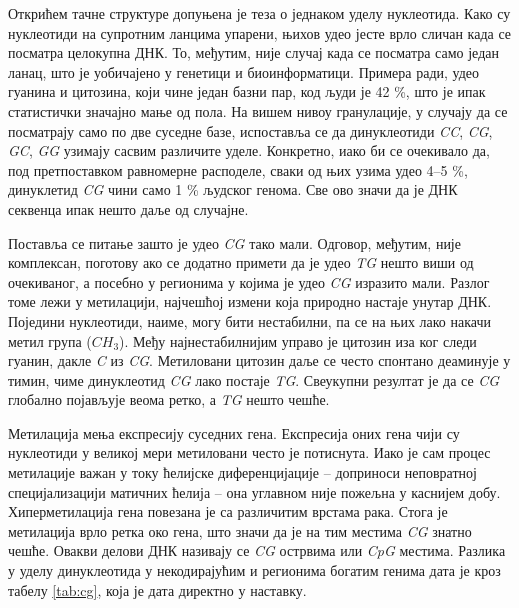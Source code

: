 \documentclass[12pt,oneside]{memoir}
\begin{document}
\begin{CJK}{UTF8}{ipxm}
Открићем тачне структуре допуњена је теза о једнаком уделу нуклеотида. Како су нуклеотиди на супротним ланцима упарени, њихов удео јесте врло сличан када се посматра целокупна ДНК. То, међутим, није случај када се посматра само један ланац, што је уобичајено у генетици и биоинформатици. Примера ради, удео гуанина и цитозина, који чине један базни пар, код људи је 42 \%, што је ипак статистички значајно мање од пола. На вишем нивоу гранулације, у случају да се посматрају само по две суседне базе, испоставља се да динуклеотиди \textit{CC}, \textit{CG}, \textit{GC}, \textit{GG} узимају сасвим различите уделе. Конкретно, иако би се очекивало да, под претпоставком равномерне расподеле, сваки од њих узима удео 4--5 \%, динуклетид \textit{CG} чини само 1 \% људског генома. Све ово значи да је ДНК секвенца ипак нешто даље од случајне.

Поставља се питање зашто је удео \textit{CG} тако мали. Одговор, међутим, није комплексан, поготову ако се додатно примети да је удео \textit{TG} нешто виши од очекиваног, а посебно у регионима у којима је удео \textit{CG} изразито мали. Разлог томе лежи у метилацији, најчешћој измени која природно настаје унутар ДНК. Поједини нуклеотиди, наиме, могу бити нестабилни, па се на њих лако накачи метил група ($CH_3$). Међу најнестабилнијим управо је цитозин иза ког следи гуанин, дакле \textit{C} из \textit{CG}. Метиловани цитозин даље се често спонтано деаминује у тимин, чиме динуклеотид \textit{CG} лако постаје \textit{TG}. Свеукупни резултат је да се \textit{CG} глобално појављује веома ретко, а \textit{TG} нешто чешће.

Метилација мења експресију суседних гена. Експресија оних гена чији су нуклеотиди у великој мери метиловани често је потиснута. Иако је сам процес метилације важан у току ћелијске диференцијације -- доприноси неповратној специјализацији матичних ћелија -- она углавном није пожељна у каснијем добу. Хиперметилација гена повезана је са различитим врстама рака. Стога је метилација врло ретка око гена, што значи да је на тим местима \textit{CG} знатно чешће. Овакви делови ДНК називају се \textit{CG} острвима или \textit{CpG} местима. Разлика у уделу динуклеотида у некодирајућим и регионима богатим генима дата је кроз табелу \ref{tab:cg}, која је дата директно у наставку.


\end{CJK}
\end{document}
